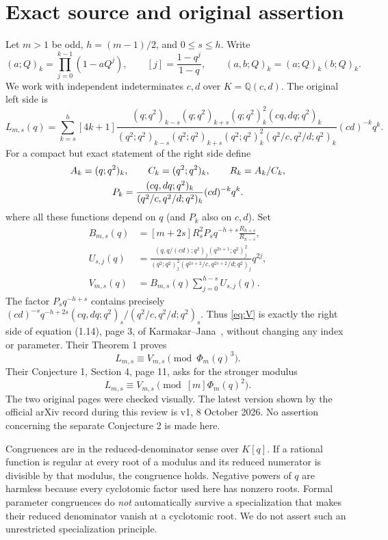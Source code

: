 \documentclass[11pt,a4paper]{article}
\begin{document}
\section{Exact source and original assertion}
Let $m>1$ be odd, $h=(m-1)/2$, and $0\leq s\leq h$.
Write
\[
 (a;Q)_k=\prod_{j=0}^{k-1}(1-aQ^j),\qquad
 [j]=\frac{1-q^j}{1-q},\qquad (a,b;Q)_k=(a;Q)_k(b;Q)_k.
\]
We work with independent indeterminates $c,d$ over $K=\mathbb Q(c,d)$.
The original left side is
\begin{equation}\label{eq:L}
 L_{m,s}(q)=\sum_{k=s}^{h}[4k+1]
 \frac{(q;q^2)_{k-s}(q;q^2)_{k+s}(q;q^2)_k^2(cq,dq;q^2)_k}
 {(q^2;q^2)_{k-s}(q^2;q^2)_{k+s}(q^2;q^2)_k^2(q^2/c,q^2/d;q^2)_k}
 (cd)^{-k}q^k.
\end{equation}
For a compact but exact statement of the right side define
\begin{gather}
 A_k=(q;q^2)_k, \qquad C_k=(q^2;q^2)_k, \qquad R_k=A_k/C_k,\label{eq:notation}\\
 P_k=\frac{(cq,dq;q^2)_k}{(q^2/c,q^2/d;q^2)_k}(cd)^{-k}q^k.\notag
\end{gather}
where all these functions depend on $q$ (and $P_k$ also on $c,d$). Set
\begin{align}
 B_{m,s}(q)&=[m+2s]R_s^2P_s q^{-h+s}\frac{R_{h+s}}{R_{h-s}},\label{eq:B}\\[3pt]
 U_{s,j}(q)&=
 \frac{(q,q/(cd);q^2)_j(q^{2s+1};q^2)_j^2}
 {(q^2;q^2)_j^2(q^{2s+2}/c,q^{2s+2}/d;q^2)_j}q^{2j},\label{eq:U}\\[3pt]
 V_{m,s}(q)&=B_{m,s}(q)\sum_{j=0}^{h-s}U_{s,j}(q).\label{eq:V}
\end{align}
The factor $P_s q^{-h+s}$ contains precisely
$(cd)^{-s}q^{-h+2s}(cq,dq;q^2)_s/(q^2/c,q^2/d;q^2)_s$.
Thus \eqref{eq:V} is exactly the right side of equation (1.14), page 3,
of Karmakar--Jana~\cite{KJ}, without changing any index or parameter.
Their Theorem 1 proves
\begin{equation}\label{eq:known}
 L_{m,s}\equiv V_{m,s}\pmod{\Phi_m(q)^3}.
\end{equation}
Their Conjecture 1, Section 4, page 11, asks for the stronger modulus
\begin{equation}\label{eq:target}
 L_{m,s}\equiv V_{m,s}\pmod{[m]\Phi_m(q)^2}.
\end{equation}
The two original pages were checked visually. The latest version shown
by the official arXiv record during this review is v1, 8 October 2026.
No assertion concerning the separate Conjecture 2 is made here.

Congruences are in the reduced-denominator sense over $K[q]$. If a
rational function is regular at every root of a modulus and its reduced
numerator is divisible by that modulus, the congruence holds. Negative
powers of $q$ are harmless because every cyclotomic factor used here has
nonzero roots. Formal parameter congruences do \emph{not} automatically
survive a specialization that makes their reduced denominator vanish at
a cyclotomic root. We do not assert such an unrestricted specialization
principle.
\end{document}
